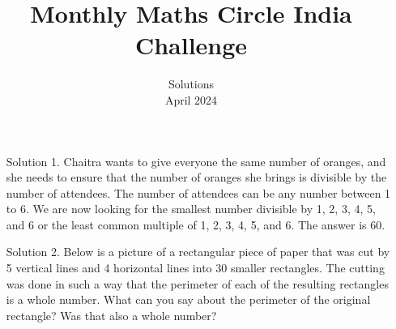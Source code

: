 \documentclass[a4paper,12pt]{article}
\title{Monthly Maths Circle India Challenge}
\date{Solutions\\April 2024}
\begin{document}
\maketitle
\thispagestyle{empty}
\begin{enumerate}
    \item[Solution 1.] Chaitra wants to give everyone the same number of oranges, and she needs to ensure that the number of oranges she brings is divisible by the number of attendees. The number of attendees can be any number between 1 to 6. We are now looking for the smallest number divisible by 1, 2, 3, 4, 5, and 6 or the least common multiple of 1, 2, 3, 4, 5, and 6. The answer is 60.


    \item[Solution 2.] Below is a picture of a rectangular piece of paper that was cut by
    5 vertical lines and 4 horizontal lines into 30 smaller rectangles. The cutting was done in such a way that the perimeter of each of the resulting rectangles is a whole number. What can you say about the perimeter of the original rectangle? Was that also a whole number?
    \begin{figure}[h]
        \centering
    \end{figure}
\end{enumerate}
\end{document}
